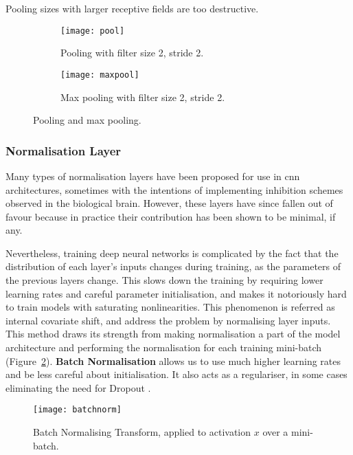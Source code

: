 Pooling sizes with larger receptive fields are too destructive.
\begin{figure}[h]
    \centering
    \begin{subfigure}[b]{0.3911299\linewidth}
        \texttt{[image: pool]}
        \caption{Pooling with filter size 2, stride 2.}
    \end{subfigure}
    \begin{subfigure}[b]{0.5988701\linewidth}
        \texttt{[image: maxpool]}
        \caption{Max pooling with filter size 2, stride 2.}
    \end{subfigure}
    \caption{Pooling and max pooling.}
    \label{fig:max_pool_2_2}
\end{figure}


\subsubsection{Normalisation Layer}
Many types of normalisation layers have been proposed for use in \acrshort{cnn}
architectures, sometimes with the intentions of implementing inhibition schemes
observed in the biological brain. However, these layers have since fallen out
of favour because in practice their contribution has been shown to be minimal,
if any.

Nevertheless, training deep neural networks is complicated by the fact that the
distribution of each layer's inputs changes during training, as the parameters
of the previous layers change. This slows down the training by requiring lower
learning rates and careful parameter initialisation, and makes it notoriously
hard to train models with saturating nonlinearities. This phenomenon is
referred as internal covariate shift, and address the problem by normalising
layer inputs. This method draws its strength from making normalisation a part
of the model architecture and performing the normalisation for each training
mini-batch (Figure~\ref{fig:batchnorm}). \textbf{Batch Normalisation} allows
us to use much higher learning rates and be less careful about initialisation.
It also acts as a regulariser, in some cases eliminating the need for Dropout
\cite{DBLP:journals/corr/IoffeS15}.
\begin{figure}[h]
    \centering
    \texttt{[image: batchnorm]}
    \caption{
        Batch Normalising Transform, applied to activation $x$ over a
        mini-batch.
    }
    \label{fig:batchnorm}
\end{figure}


